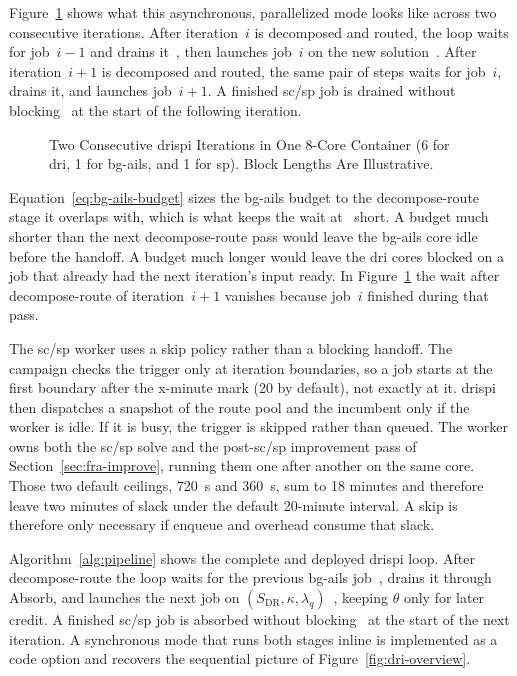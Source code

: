 Figure~\ref{fig:pipeline-swimlane} shows what this asynchronous, parallelized mode looks like across two consecutive iterations. After iteration~$i$ is decomposed and routed, the loop waits for job~$i{-}1$ and drains it~, then launches job~$i$ on the new solution~. After iteration~$i{+}1$ is decomposed and routed, the same pair of steps waits for job~$i$, drains it, and launches job~$i{+}1$. A finished \gls{sc}/\gls{sp} job is drained without blocking~ at the start of the following iteration.

\begin{figure}[tbp]
\centering
\resizebox{\linewidth}{!}{}
\caption[Two Consecutive DRISPI Iterations in One 8-Core Container (6 for DRI, 1 for BG-AILS, and 1 for SP). Block Lengths Are Illustrative.]{Two Consecutive \gls{drispi} Iterations in One 8-Core Container 
(6 for \gls{dri}, 1 for \gls{bg-ails}, and 1 for \gls{sp}). Block Lengths Are Illustrative.}
\label{fig:pipeline-swimlane}
\end{figure}

Equation~\ref{eq:bg-ails-budget} sizes the \gls{bg-ails} budget to the decompose-route stage it overlaps with, which is what keeps the wait at~ short. A budget much shorter than the next decompose-route pass would leave the \gls{bg-ails} core idle before the handoff. A budget much longer would leave the \gls{dri} cores blocked on a job that already had the next iteration's input ready. In Figure~\ref{fig:pipeline-swimlane} the wait after decompose-route of iteration~$i{+}1$ vanishes because job~$i$ finished during that pass.

The \gls{sc}/\gls{sp} worker uses a skip policy rather than a blocking handoff. The campaign checks the trigger only at iteration boundaries, so a job starts at the first boundary after the x-minute mark (20 by default), not exactly at it. \gls{drispi} then dispatches a snapshot of the route pool and the incumbent only if the worker is idle. If it is busy, the trigger is skipped rather than queued. The worker owns both the \gls{sc}/\gls{sp} solve and the post-\gls{sc}/\gls{sp} improvement pass of Section~\ref{sec:fra-improve}, running them one after another on the same core. Those two default ceilings, 720~s and 360~s, sum to 18 minutes and therefore leave two minutes of slack under the default 20-minute interval. A skip is therefore only necessary if enqueue and overhead consume that slack.

Algorithm~\ref{alg:pipeline} shows the complete and deployed \gls{drispi} loop. After decompose-route the loop waits for the previous \gls{bg-ails} job~, drains it through Absorb, and launches the next job on $(S_{\mathrm{DR}}, \kappa, \lambda_q)$~, keeping $\theta$ only for later credit. A finished \gls{sc}/\gls{sp} job is absorbed without blocking~ at the start of the next iteration. A synchronous mode that runs both stages inline is implemented as a code option and recovers the sequential picture of Figure~\ref{fig:dri-overview}.

